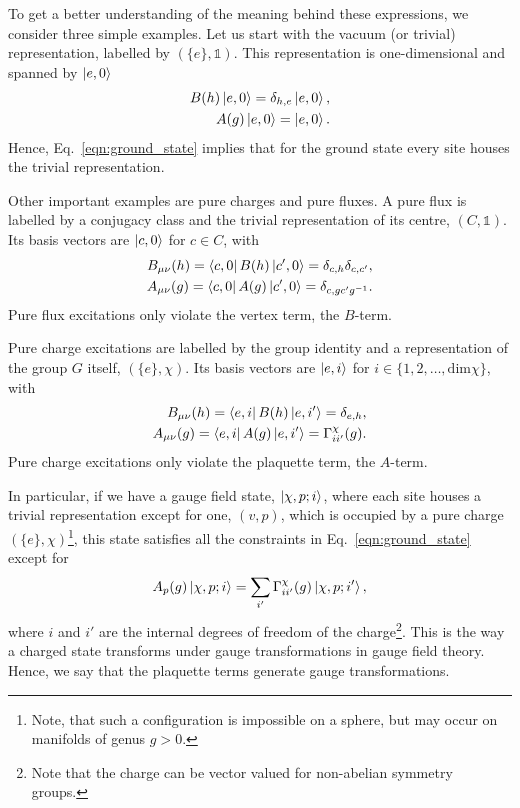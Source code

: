 \documentclass[a4paper,twocolumn,11pt]{quantumarticle}
\begin{document}
To get a better understanding of the meaning behind these expressions, we consider three simple examples. Let us start with the vacuum (or trivial) representation, labelled by $(\{e\}, \mathbb{1})$. This representation is one-dimensional and spanned by $\ket{e, 0}$
\begin{equation}
    \begin{split}
        B{(h)}\ket{e, 0} = \delta_{h,e}\ket{e, 0},\\
        A{(g)}\ket{e, 0} = \ket{e,0}.
    \end{split}
\end{equation}
Hence, Eq.~\eqref{eqn:ground_state} implies that for the ground state every site houses the trivial representation.

Other important examples are pure charges and pure fluxes. A pure flux is labelled by a conjugacy class and the trivial representation of its centre, $(C, \mathbb{1})$. Its basis vectors are $\ket{c, 0}$ for $c \in C$, with
\begin{equation}
    \begin{split}
        B_{\mu\nu}{(h)}=\bra{c, 0} B{(h)} \ket{c', 0} = \delta_{c, h} \delta_{c, c'}, \\
        A_{\mu\nu}{(g)}= \bra{c, 0} A{(g)} \ket{c', 0} = \delta_{c,gc'g^{-1}}.
    \end{split}
\end{equation}
Pure flux excitations only violate the vertex term, the $B$-term.

Pure charge excitations are labelled by the group identity and a representation of the group $G$ itself, $(\{e\}, \chi)$. Its basis vectors are $\ket{e, i}$ for $i \in \{1, 2, \ldots, \text{dim}\chi\}$, with
\begin{equation}
    \begin{split}
        B_{\mu\nu}{(h)}=\bra{e, i} B{(h)} \ket{e, i'} = \delta_{e, h},\\
        A_{\mu\nu}{(g)} = \bra{e, i} A{(g)} \ket{e, i'} = \Gamma^\chi_{ii'}(g).
    \end{split}
\end{equation}
Pure charge excitations only violate the plaquette term, the $A$-term.



In particular, if we have a gauge field state, $\ket{\chi, p; i}$, where each site houses a trivial representation except for one, $(v, p)$, which is occupied by a pure charge $(\{e\}, \chi)$\footnote{Note, that such a configuration is impossible on a sphere, but may occur on manifolds of genus $g>0$.}, this state satisfies all the constraints in Eq.~\eqref{eqn:ground_state} except for
\begin{equation}
    A_p{(g)}\ket{\chi, p; i} = \sum_{i'} \Gamma^\chi_{ii'}(g)\ket{\chi, p; i'},\label{eqn:tranfs}
\end{equation}
where $i$ and $i'$ are the internal degrees of freedom of the charge\footnote{Note that the charge can be vector valued for non-abelian symmetry groups.}.
This is the way a charged state transforms under gauge transformations in gauge field theory. Hence, we say that the plaquette terms generate gauge transformations.
\end{document}
